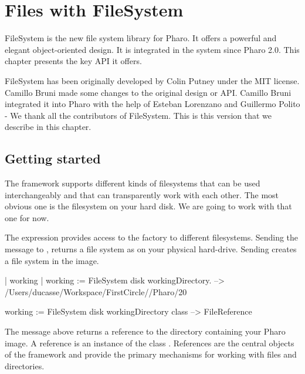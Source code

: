 \documentclass[a4paper,10pt,twoside]{book}
\begin{document}
\fi
\sloppy
\chapter{Files with FileSystem }
 
FileSystem is the new file system library for Pharo. It offers a powerful and elegant object-oriented design. 
It is integrated in the system since Pharo 2.0. This chapter presents the key API it offers. 

FileSystem has been originally developed by Colin Putney under the MIT license. Camillo Bruni made some changes to the original design or API. Camillo Bruni integrated it into Pharo with the help of Esteban Lorenzano and Guillermo Polito - We thank all the contributors of FileSystem. This is this version that we describe in this chapter. 

\section{Getting started}
The framework supports different kinds of filesystems that can be used interchangeably and that can transparently work with each other. The most obvious one is the filesystem on your hard disk. We are going to work with that one for now. 

The expression  provides access to the factory to different filesystems. 
Sending the message  to , returns a file system as on your physical hard-drive. Sending  creates a file system in the image. 

\begin{code}{}
| working |
working := FileSystem disk workingDirectory.
--> /Users/ducasse/Workspace/FirstCircle//Pharo/20

working := FileSystem disk workingDirectory class 
--> FileReference
\end{code} 

The message  above returns a reference to the directory containing your Pharo image. A reference is an instance of the class . References are the central objects of the framework and provide the primary mechanisms for working with files and directories. 
\end{document}

